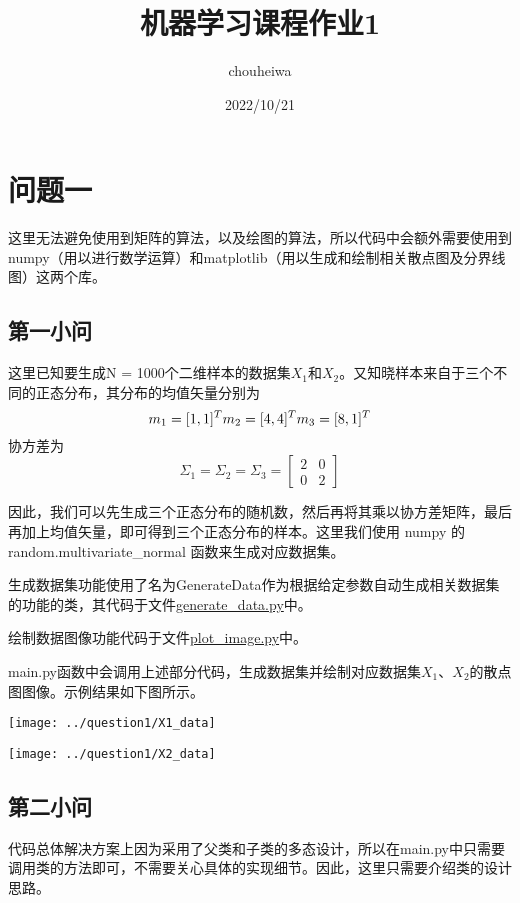 \documentclass[UTF8]{article} %
\title{机器学习课程作业1}
\author{chouheiwa}
\date{2022/10/21}
\begin{document}
    \maketitle
    \tableofcontents

    \section{问题一}
    这里无法避免使用到矩阵的算法，以及绘图的算法，所以代码中会额外需要使用到numpy（用以进行数学运算）和matplotlib（用以生成和绘制相关散点图及分界线图）这两个库。

    \subsection{第一小问}
    这里已知要生成N = 1000个二维样本的数据集$X_1$和$X_2$。又知晓样本来自于三个不同的正态分布，其分布的均值矢量分别为
    \[
        m_1 = [1, 1]^T\\m_2 = [4, 4]^T\\m_3 = [8, 1]^T
    \]
    协方差为
    \[
        \Sigma_1 = \Sigma_2 = \Sigma_3 = \begin{bmatrix}
                                             2 & 0 \\ 0 & 2
        \end{bmatrix}
    \]

    因此，我们可以先生成三个正态分布的随机数，然后再将其乘以协方差矩阵，最后再加上均值矢量，即可得到三个正态分布的样本。这里我们使用 numpy 的 random.multivariate\_normal 函数来生成对应数据集。

    生成数据集功能使用了名为GenerateData作为根据给定参数自动生成相关数据集的功能的类，其代码于文件\href{run:generate_data.py}{generate\_data.py}中。

    绘制数据图像功能代码于文件\href{run:plot_image.py}{plot\_image.py}中。

    main.py函数中会调用上述部分代码，生成数据集并绘制对应数据集$X_1$、$X_2$的散点图图像。示例结果如下图所示。


    \begin{minipage}[t]{0.5\linewidth}
        \centering
        \texttt{[image: ../question1/X1\_data]}
    \end{minipage}%
    \begin{minipage}[t]{0.5\linewidth}
        \centering
        \texttt{[image: ../question1/X2\_data]}
    \end{minipage}

    \subsection{第二小问} \label{sec:question1_2}
    代码总体解决方案上因为采用了父类和子类的多态设计，所以在main.py中只需要调用类的方法即可，不需要关心具体的实现细节。因此，这里只需要介绍类的设计思路。
\end{document}
